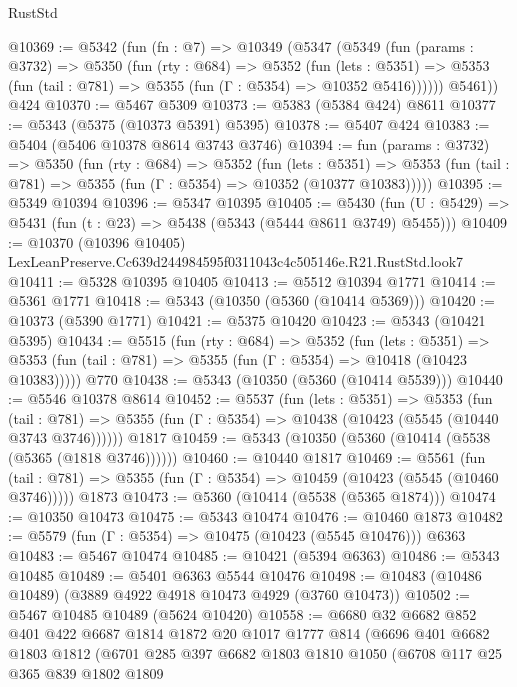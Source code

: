 \begin{lexlean}{RustStd}
\begin{coremodule}
@10369 := @5342
    (fun (fn : @7) =>
    @10349
      (@5347
        (@5349
          (fun (params : @3732) =>
          @5350
            (fun (rty : @684) =>
            @5352
              (fun (lets : @5351) =>
              @5353 (fun (tail : @781) => @5355 (fun (Γ : @5354) => @10352 @5416))))))
        @5461))
    @424
@10370 := @5467 @5309
@10373 := @5383 (@5384 @424) @8611
@10377 := @5343 (@5375 (@10373 @5391) @5395)
@10378 := @5407 @424
@10383 := @5404 (@5406 @10378 @8614 @3743 @3746)
@10394 := fun (params : @3732) =>
  @5350
    (fun (rty : @684) =>
    @5352
      (fun (lets : @5351) =>
      @5353 (fun (tail : @781) => @5355 (fun (Γ : @5354) => @10352 (@10377 @10383)))))
@10395 := @5349 @10394
@10396 := @5347 @10395
@10405 := @5430
    (fun (U : @5429) => @5431 (fun (t : @23) => @5438 (@5343 (@5444 @8611 @3749) @5455)))
@10409 := @10370 (@10396 @10405) LexLeanPreserve.Cc639d244984595f0311043c4c505146e.R21.RustStd.look7
@10411 := @5328 @10395 @10405
@10413 := @5512 @10394 @1771
@10414 := @5361 @1771
@10418 := @5343 (@10350 (@5360 (@10414 @5369)))
@10420 := @10373 (@5390 @1771)
@10421 := @5375 @10420
@10423 := @5343 (@10421 @5395)
@10434 := @5515
    (fun (rty : @684) =>
    @5352
      (fun (lets : @5351) =>
      @5353 (fun (tail : @781) => @5355 (fun (Γ : @5354) => @10418 (@10423 @10383)))))
    @770
@10438 := @5343 (@10350 (@5360 (@10414 @5539)))
@10440 := @5546 @10378 @8614
@10452 := @5537
    (fun (lets : @5351) =>
    @5353
      (fun (tail : @781) =>
      @5355 (fun (Γ : @5354) => @10438 (@10423 (@5545 (@10440 @3743 @3746))))))
    @1817
@10459 := @5343 (@10350 (@5360 (@10414 (@5538 (@5365 (@1818 @3746))))))
@10460 := @10440 @1817
@10469 := @5561
    (fun (tail : @781) => @5355 (fun (Γ : @5354) => @10459 (@10423 (@5545 (@10460 @3746)))))
    @1873
@10473 := @5360 (@10414 (@5538 (@5365 @1874)))
@10474 := @10350 @10473
@10475 := @5343 @10474
@10476 := @10460 @1873
@10482 := @5579 (fun (Γ : @5354) => @10475 (@10423 (@5545 @10476))) @6363
@10483 := @5467 @10474
@10485 := @10421 (@5394 @6363)
@10486 := @5343 @10485
@10489 := @5401 @6363 @5544 @10476
@10498 := @10483 (@10486 @10489) (@3889 @4922 @4918 @10473 @4929 (@3760 @10473))
@10502 := @5467 @10485 @10489 (@5624 @10420)
@10558 := @6680
    @32
    @6682
    @852
    @401
    @422
    @6687
    @1814
    @1872
    @20
    @1017
    @1777
    @814
    (@6696
      @401
      @6682
      @1803
      @1812
      (@6701
        @285
        @397
        @6682
        @1803
        @1810
        @1050
        (@6708
          @117
          @25
          @365
          @839
          @1802
          @1809

\end{coremodule}
\end{lexlean}
